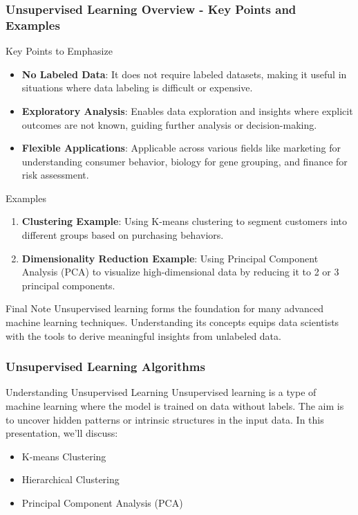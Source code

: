 \documentclass[aspectratio=169]{beamer}
\begin{document}
\begin{frame}[fragile]
    \frametitle{Unsupervised Learning Overview - Key Points and Examples}
    \begin{block}{Key Points to Emphasize}
        \begin{itemize}
            \item \textbf{No Labeled Data}: It does not require labeled datasets, making it useful in situations where data labeling is difficult or expensive.
            \item \textbf{Exploratory Analysis}: Enables data exploration and insights where explicit outcomes are not known, guiding further analysis or decision-making.
            \item \textbf{Flexible Applications}: Applicable across various fields like marketing for understanding consumer behavior, biology for gene grouping, and finance for risk assessment.
        \end{itemize}
    \end{block}
    
    \begin{block}{Examples}
        \begin{enumerate}
            \item \textbf{Clustering Example}: Using K-means clustering to segment customers into different groups based on purchasing behaviors.
            \item \textbf{Dimensionality Reduction Example}: Using Principal Component Analysis (PCA) to visualize high-dimensional data by reducing it to 2 or 3 principal components.
        \end{enumerate}
    \end{block}

    \begin{block}{Final Note}
        Unsupervised learning forms the foundation for many advanced machine learning techniques. Understanding its concepts equips data scientists with the tools to derive meaningful insights from unlabeled data.
    \end{block}
\end{frame}

\begin{frame}[fragile]
    \frametitle{Unsupervised Learning Algorithms}
    \begin{block}{Understanding Unsupervised Learning}
        Unsupervised learning is a type of machine learning where the model is trained on data without labels. The aim is to uncover hidden patterns or intrinsic structures in the input data. 
        In this presentation, we'll discuss:
    \end{block}
    \begin{itemize}
        \item K-means Clustering
        \item Hierarchical Clustering
        \item Principal Component Analysis (PCA)
    \end{itemize}
\end{frame}
\end{document}
